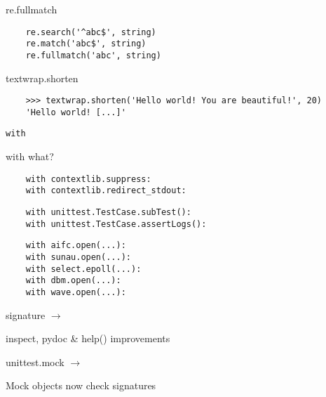 \documentclass[20pt]{beamer}
\renewcommand\emph[1]{\textcolor{taskyblue}{#1}}
\newcommand\muted[1]{{\textcolor{muted}{#1}}}
\newcommand\fromthreethree[1]{{\muted{#1 $\rightarrow$}\bigskip}}
\begin{document}
\begin{center}
\begin{frame}[fragile]
    re.\emph{fullmatch}
    \bigskip

    \tiny
    \begin{verbatim}
    re.search('^abc$', string)
    re.match('abc$', string)
    re.fullmatch('abc', string)
    \end{verbatim}
\end{frame}

\begin{frame}[fragile]
    textwrap.\emph{shorten}
    \bigskip

    \tiny
    \begin{verbatim}
    >>> textwrap.shorten('Hello world! You are beautiful!', 20)
    'Hello world! [...]'
    \end{verbatim}
\end{frame}

\begin{frame}[fragile]
    \verb+with+

    \pause
    with what?

    \bigskip
    \pause

    \tiny

    \begin{verbatim}
    with contextlib.suppress:
    with contextlib.redirect_stdout:
    \end{verbatim}

    \pause

    \begin{verbatim}
    with unittest.TestCase.subTest():
    with unittest.TestCase.assertLogs():
    \end{verbatim}

    \pause

    \begin{verbatim}
    with aifc.open(...):
    with sunau.open(...):
    with select.epoll(...):
    with dbm.open(...):
    with wave.open(...):
    \end{verbatim}
\end{frame}

\begin{frame}[fragile]
    \fromthreethree{signature}

    inspect, pydoc \& help() improvements

    \bigskip\bigskip
    \pause

    \fromthreethree{unittest.mock}

    Mock objects now check signatures
\end{frame}


\end{center}
\end{document}
